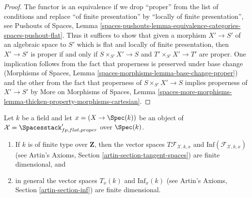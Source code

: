 \begin{proof}
The functor is an equivalence if we drop ``proper'' from the list
of conditions and replace ``of finite presentation'' by
``locally of finite presentation'', see Pushouts of Spaces, Lemma
\ref{spaces-pushouts-lemma-equivalence-categories-spaces-pushout-flat}.
Thus it suffices to show that given a morphism
$X' \to S'$ of an algebraic space to $S'$ which is
flat and locally of finite presentation, then
$X' \to S'$ is proper if and only if $S \times_{S'} X' \to S$
and $T' \times_{S'} X' \to T'$ are proper.
One implication follows from the fact that
properness is preserved under base change
(Morphisms of Spaces, Lemma \ref{spaces-morphisms-lemma-base-change-proper})
and the other from the fact that properness of $S \times_{S'} X' \to S$
implies properness of $X' \to S'$ by
More on Morphisms of Spaces, Lemma
\ref{spaces-more-morphisms-lemma-thicken-property-morphisms-cartesian}.
\end{proof}

\begin{lemma}
\label{lemma-spaces-tangent-space}
Let $k$ be a field and let $x = (X \to \Spec(k))$ be an object of
$\mathcal{X} = \Spacesstack'_{fp, flat, proper}$ over $\Spec(k)$.
\begin{enumerate}
\item If $k$ is of finite type over $\mathbf{Z}$, then
the vector spaces $T\mathcal{F}_{\mathcal{X}, k, x}$ and
$\text{Inf}(\mathcal{F}_{\mathcal{X}, k, x})$
(see Artin's Axioms, Section \ref{artin-section-tangent-spaces})
are finite dimensional, and
\item in general the vector spaces $T_x(k)$ and $\text{Inf}_x(k)$
(see Artin's Axioms, Section \ref{artin-section-inf})
are finite dimensional.
\end{enumerate}
\end{lemma}

